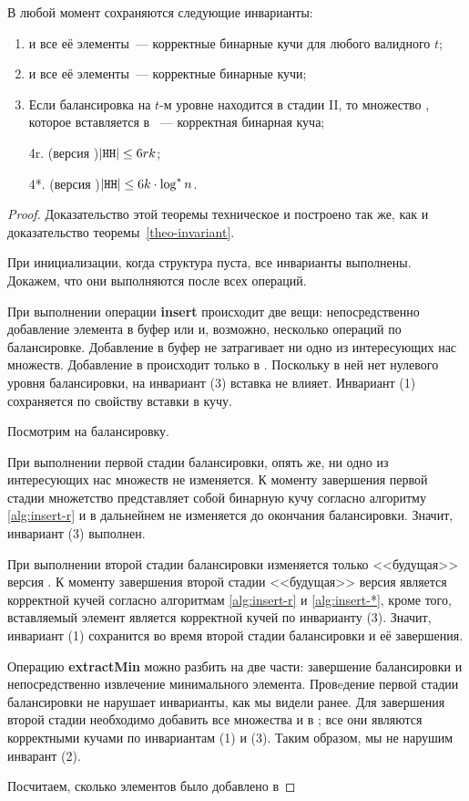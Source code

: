 \begin{theorem} \label{th:invar}
В любой момент сохраняются следующие инварианты:
\begin{enumerate}
\item \MH[t] и все её элементы~--- корректные бинарные кучи для любого валидного $t$;
\item \HH и все её элементы~--- корректные бинарные кучи;
\item Если балансировка на $t$-м уровне находится в стадии II, то множество \T[t], которое
вставляется в \MH[t+1]~--- корректная бинарная куча;
\item[4r.] (версия {\CH[r]})\quad $|\texttt{HH}| \leq 6rk$;
\item[4*.] (версия {\CH[*]})\quad $|\texttt{HH}| \leq 6k\cdot \log^* n$.
\addtocounter{enumi}{-1}
\end{enumerate}
\end{theorem}
\begin{proof}
Доказательство этой теоремы техническое и построено так же, как и
доказательство теоремы~\ref{theo-invariant}.

При инициализации, когда структура пуста, все инварианты выполнены. Докажем,
что они выполняются после всех операций.

При выполнении операции \textbf{insert} происходит две вещи: непосредственно добавление
элемента в буфер или \MH[1] и, возможно, несколько операций по балансировке. Добавление
в буфер не затрагивает ни одно из интересующих нас множеств. Добавление в \MH[1]
происходит только в \CH[*]. Поскольку в ней нет нулевого уровня балансировки,
на инвариант (3) вставка не влияет. Инвариант (1) сохраняется по свойству вставки в кучу.

Посмотрим на балансировку.

При выполнении первой стадии балансировки, опять же, ни одно из интересующих
нас множеств не изменяется. К моменту завершения первой стадии множетство
\T[0] представляет собой бинарную кучу согласно алгоритму \ref{alg:insert-r}
и в дальнейнем не изменяется до окончания балансировки. Значит, инвариант
(3) выполнен.

При выполнении второй стадии балансировки изменяется только <<будущая>>
версия \MH. К моменту завершения второй стадии <<будущая>> версия является
корректной кучей согласно алгоритмам \ref{alg:insert-r} и \ref{alg:insert-*},
кроме того, вставляемый элемент является корректной кучей по инварианту (3). Значит,
инвариант (1) сохранится во время второй стадии балансировки и её завершения.

Операцию \textbf{extractMin} можно разбить на две части: завершение балансировки
и непосредственно извлечение минимального элемента. Провeдение первой стадии
балансировки не нарушает инварианты, как мы видели ранее. Для завершения
второй стадии необходимо добавить все множества \T[t] и \MH[t] в \HH; все они
являются корректными кучами по инвариантам (1) и (3). Таким образом, мы не нарушим
инварант (2).

Посчитаем, сколько элементов было добавлено в \HH

\end{proof}


